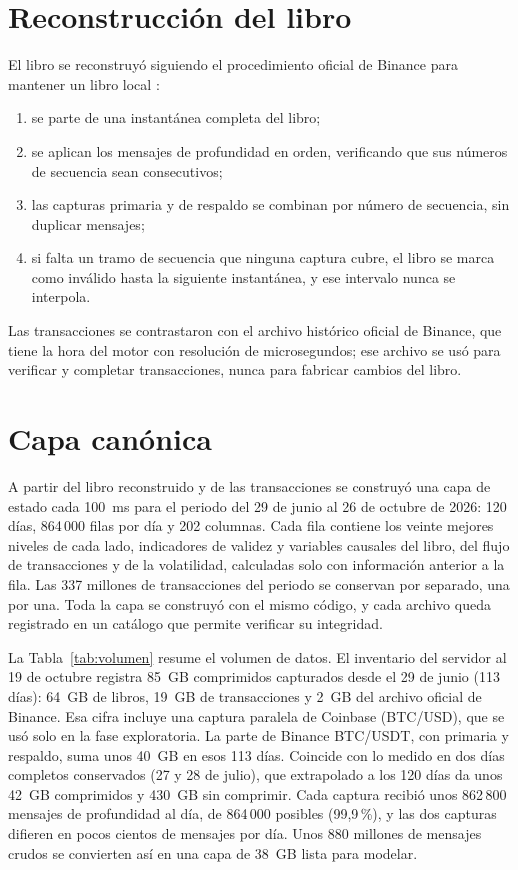 \section{Reconstrucción del libro}
El libro se reconstruyó siguiendo el procedimiento oficial de Binance para mantener un libro local \citep{BinanceSpotWebSocketDocs}:
\begin{enumerate}[nosep]
\item se parte de una instantánea completa del libro;
\item se aplican los mensajes de profundidad en orden, verificando que sus números de secuencia sean consecutivos;
\item las capturas primaria y de respaldo se combinan por número de secuencia, sin duplicar mensajes;
\item si falta un tramo de secuencia que ninguna captura cubre, el libro se marca como inválido hasta la siguiente instantánea, y ese intervalo nunca se interpola.
\end{enumerate}
Las transacciones se contrastaron con el archivo histórico oficial de Binance, que tiene la hora del motor con resolución de microsegundos; ese archivo se usó para verificar y completar transacciones, nunca para fabricar cambios del libro.

\section{Capa canónica}
A partir del libro reconstruido y de las transacciones se construyó una capa de estado cada 100~ms para el periodo del 29 de junio al 26 de octubre de 2026: 120 días, 864\,000 filas por día y 202 columnas. Cada fila contiene los veinte mejores niveles de cada lado, indicadores de validez y variables causales del libro, del flujo de transacciones y de la volatilidad, calculadas solo con información anterior a la fila. Las 337 millones de transacciones del periodo se conservan por separado, una por una. Toda la capa se construyó con el mismo código, y cada archivo queda registrado en un catálogo que permite verificar su integridad.

La Tabla~\ref{tab:volumen} resume el volumen de datos. El inventario del servidor al 19 de octubre registra 85~GB comprimidos capturados desde el 29 de junio (113 días): 64~GB de libros, 19~GB de transacciones y 2~GB del archivo oficial de Binance. Esa cifra incluye una captura paralela de Coinbase (BTC/USD), que se usó solo en la fase exploratoria. La parte de Binance BTC/USDT, con primaria y respaldo, suma unos 40~GB en esos 113 días. Coincide con lo medido en dos días completos conservados (27 y 28 de julio), que extrapolado a los 120 días da unos 42~GB comprimidos y 430~GB sin comprimir. Cada captura recibió unos 862\,800 mensajes de profundidad al día, de 864\,000 posibles (99,9\,\%), y las dos capturas difieren en pocos cientos de mensajes por día. Unos 880 millones de mensajes crudos se convierten así en una capa de 38~GB lista para modelar.

